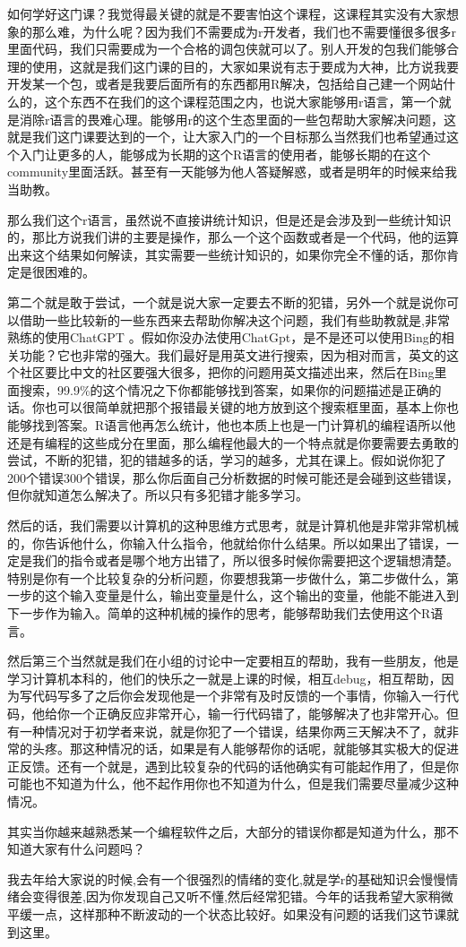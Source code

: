 \documentclass[
  oneside]{book}
\begin{document}
如何学好这门课？我觉得最关键的就是不要害怕这个课程，这课程其实没有大家想象的那么难，为什么呢？因为我们不需要成为r开发者，我们也不需要懂很多很多r里面代码，我们只需要成为一个合格的调包侠就可以了。别人开发的包我们能够合理的使用，这就是我们这门课的目的，大家如果说有志于要成为大神，比方说我要开发某一个包，或者是我要后面所有的东西都用R解决，包括给自己建一个网站什么的，这个东西不在我们的这个课程范围之内，也说大家能够用r语言，第一个就是消除r语言的畏难心理。能够用r的这个生态里面的一些包帮助大家解决问题，这就是我们这门课要达到的一个，让大家入门的一个目标那么当然我们也希望通过这个入门让更多的人，能够成为长期的这个R语言的使用者，能够长期的在这个community里面活跃。甚至有一天能够为他人答疑解惑，或者是明年的时候来给我当助教。

那么我们这个r语言，虽然说不直接讲统计知识，但是还是会涉及到一些统计知识的，那比方说我们讲的主要是操作，那么一个这个函数或者是一个代码，他的运算出来这个结果如何解读，其实需要一些统计知识的，如果你完全不懂的话，那你肯定是很困难的。

第二个就是敢于尝试，一个就是说大家一定要去不断的犯错，另外一个就是说你可以借助一些比较新的一些东西来去帮助你解决这个问题，我们有些助教就是,非常熟练的使用ChatGPT 。假如你没办法使用ChatGpt，是不是还可以使用Bing的相关功能？它也非常的强大。我们最好是用英文进行搜索，因为相对而言，英文的这个社区要比中文的社区要强大很多，把你的问题用英文描述出来，然后在Bing里面搜索，99.9\%的这个情况之下你都能够找到答案，如果你的问题描述是正确的话。你也可以很简单就把那个报错最关键的地方放到这个搜索框里面，基本上你也能够找到答案。R语言他再怎么统计，他也本质上也是一门计算机的编程语所以他还是有编程的这些成分在里面，那么编程他最大的一个特点就是你要需要去勇敢的尝试，不断的犯错，犯的错越多的话，学习的越多，尤其在课上。假如说你犯了200个错误300个错误，那么你后面自己分析数据的时候可能还是会碰到这些错误，但你就知道怎么解决了。所以只有多犯错才能多学习。

然后的话，我们需要以计算机的这种思维方式思考，就是计算机他是非常非常机械的，你告诉他什么，你输入什么指令，他就给你什么结果。所以如果出了错误，一定是我们的指令或者是哪个地方出错了，所以很多时候你需要把这个逻辑想清楚。特别是你有一个比较复杂的分析问题，你要想我第一步做什么，第二步做什么，第一步的这个输入变量是什么，输出变量是什么，这个输出的变量，他能不能进入到下一步作为输入。简单的这种机械的操作的思考，能够帮助我们去使用这个R语言。

然后第三个当然就是我们在小组的讨论中一定要相互的帮助，我有一些朋友，他是学习计算机本科的，他们的快乐之一就是上课的时候，相互debug，相互帮助，因为写代码写多了之后你会发现他是一个非常有及时反馈的一个事情，你输入一行代码，他给你一个正确反应非常开心，输一行代码错了，能够解决了也非常开心。但有一种情况对于初学者来说，就是你犯了一个错误，结果你两三天解决不了，就非常的头疼。那这种情况的话，如果是有人能够帮你的话呢，就能够其实极大的促进正反馈。还有一个就是，遇到比较复杂的代码的话他确实有可能起作用了，但是你可能也不知道为什么，他不起作用你也不知道为什么，但是我们需要尽量减少这种情况。

其实当你越来越熟悉某一个编程软件之后，大部分的错误你都是知道为什么，那不知道大家有什么问题吗？

我去年给大家说的时候,会有一个很强烈的情绪的变化,就是学r的基础知识会慢慢情绪会变得很差,因为你发现自己又听不懂,然后经常犯错。今年的话我希望大家稍微平缓一点，这样那种不断波动的一个状态比较好。如果没有问题的话我们这节课就到这里。

\printbibliography
\end{document}
